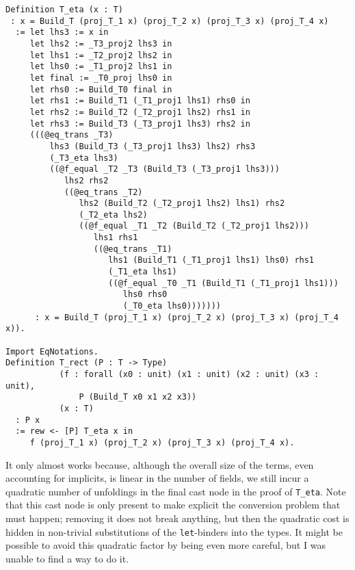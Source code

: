 \begin{verbatim}
Definition T_eta (x : T)
 : x = Build_T (proj_T_1 x) (proj_T_2 x) (proj_T_3 x) (proj_T_4 x)
  := let lhs3 := x in
     let lhs2 := _T3_proj2 lhs3 in
     let lhs1 := _T2_proj2 lhs2 in
     let lhs0 := _T1_proj2 lhs1 in
     let final := _T0_proj lhs0 in
     let rhs0 := Build_T0 final in
     let rhs1 := Build_T1 (_T1_proj1 lhs1) rhs0 in
     let rhs2 := Build_T2 (_T2_proj1 lhs2) rhs1 in
     let rhs3 := Build_T3 (_T3_proj1 lhs3) rhs2 in
     (((@eq_trans _T3)
         lhs3 (Build_T3 (_T3_proj1 lhs3) lhs2) rhs3
         (_T3_eta lhs3)
         ((@f_equal _T2 _T3 (Build_T3 (_T3_proj1 lhs3)))
            lhs2 rhs2
            ((@eq_trans _T2)
               lhs2 (Build_T2 (_T2_proj1 lhs2) lhs1) rhs2
               (_T2_eta lhs2)
               ((@f_equal _T1 _T2 (Build_T2 (_T2_proj1 lhs2)))
                  lhs1 rhs1
                  ((@eq_trans _T1)
                     lhs1 (Build_T1 (_T1_proj1 lhs1) lhs0) rhs1
                     (_T1_eta lhs1)
                     ((@f_equal _T0 _T1 (Build_T1 (_T1_proj1 lhs1)))
                        lhs0 rhs0
                        (_T0_eta lhs0)))))))
      : x = Build_T (proj_T_1 x) (proj_T_2 x) (proj_T_3 x) (proj_T_4 x)).

Import EqNotations.
Definition T_rect (P : T -> Type)
           (f : forall (x0 : unit) (x1 : unit) (x2 : unit) (x3 : unit),
               P (Build_T x0 x1 x2 x3))
           (x : T)
  : P x
  := rew <- [P] T_eta x in
     f (proj_T_1 x) (proj_T_2 x) (proj_T_3 x) (proj_T_4 x).
\end{verbatim}
  It only almost works because, although the overall size of the terms, even accounting for implicits, is linear in the number of fields, we still incur a quadratic number of unfoldings in the final cast node in the proof of \texttt{T_eta}.
  Note that this cast node is only present to make explicit the conversion problem that must happen; removing it does not break anything, but then the quadratic cost is hidden in non-trivial substitutions of the \texttt{let}-binders into the types.
  It might be possible to avoid this quadratic factor by being even more careful, but I was unable to find a way to do it.%
